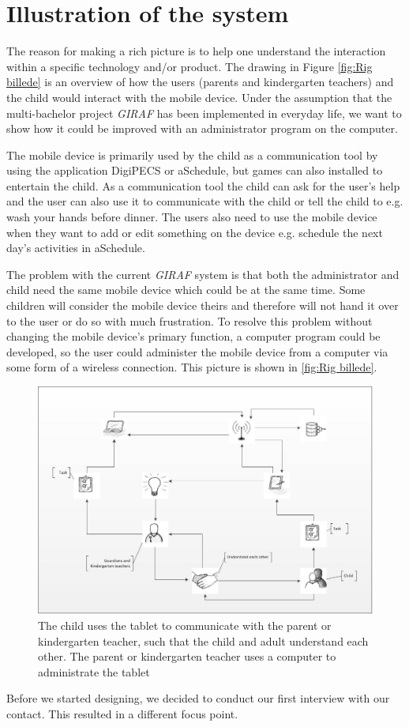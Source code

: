\section{Illustration of the system}
The reason for making a rich picture is to help one understand the interaction within a specific technology and/or product\cite{OOAD}. The drawing in Figure \vref{fig:Rig billede} is an overview of how the users (parents and kindergarten teachers) and the child would interact with the mobile device. Under the assumption that the multi-bachelor project \textit{GIRAF} has been implemented in everyday life, we want to show how it could be improved with an administrator program on the computer.

The mobile device is primarily used by the child as a communication tool by using the application DigiPECS or aSchedule, but games can also installed to entertain the child. As a communication tool the child can ask for the user's help and the user can also use it to communicate with the child or tell the child to e.g. wash your hands before dinner. 
The users also need to use the mobile device when they want to add or edit something on the device e.g. schedule the next day's activities in aSchedule.  
 
The problem with the current \textit{GIRAF} system is that both the administrator and child need the same mobile device which could be at the same time. Some children will consider the mobile device theirs and therefore will not hand it over to the user or do so with much frustration. To resolve this problem without changing the mobile device's primary function, a computer program could be developed, so the user could administer the mobile device from a computer via some form of a wireless connection. This picture is shown in \vref{fig:Rig billede}. 

\begin{figure}[!ht]
	\centering
		\includegraphics[width=1.00\textwidth]{img/Rig_billede2.jpg}
	\caption{The child uses the tablet to communicate with the parent or kindergarten teacher, such that the child and adult understand each other. The parent or kindergarten teacher uses a computer to administrate the tablet}
	\label{fig:Rig billede}
\end{figure}
\newpage

Before we started designing, we decided to conduct our first interview with our contact. This resulted in a different focus point.
    